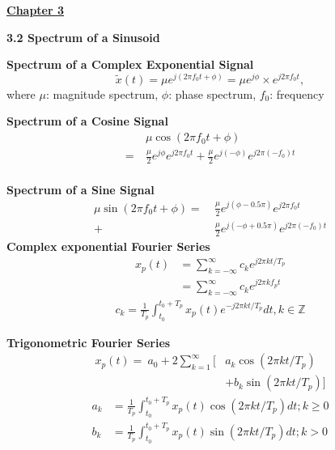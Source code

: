 \documentclass[landscape,a4paper]{extarticle}
\begin{document}
\begin{multicols*}{5}
    \textbf{\uline{Chapter 3}}

    \textbf{3.2 Spectrum of a Sinusoid}

    \textbf{Spectrum of a Complex Exponential Signal}
    \[
        \tilde{x}(t)=\mu e^{j(2\pi f_0t+\phi)} = \mu e^{j\phi} \times e^{j2\pi f_0t},
    \]where $\mu$: magnitude spectrum, $\phi$: phase spectrum, $f_0$: frequency

    \textbf{Spectrum of a Cosine Signal}
    \begin{align*}
        &\mu \cos(2\pi f_0t + \phi)\\
        = \ &\frac{\mu}{2}e^{j\phi}e^{j2\pi f_0t} + \frac{\mu}{2}  e^{j(-\phi)}e^{j2\pi (-f_0)t}
    \end{align*}\\
    \textbf{Spectrum of a Sine Signal}
    \begin{align*}
        \mu\sin(2\pi f_0 t + \phi)
        =\ &\frac{\mu}{2}e^{j(\phi - 0.5\pi)}e^{j2\pi f_0t} \\
        + \ &\frac{\mu}{2}e^{j(-\phi+0.5\pi)}e^{j2\pi (-f_0)t}
    \end{align*}
    \textbf{Complex exponential Fourier Series}
    \begin{align*}
        x_p(t)&=\sum_{k=-\infty}^{\infty}c_ke^{j2\pi kt/T_p}\\
        &=\sum_{k=-\infty}^{\infty}c_ke^{j2\pi kf_pt} \tag{3.1a}
    \end{align*}
    \begin{align*}
        c_k=\frac{1}{T_p}\int_{t_0}^{t_0+T_p}x_p(t)e^{-j2\pi kt/T_p}dt, k \in \mathbb{Z} \tag{3.1b}
    \end{align*}

    \textbf{Trigonometric Fourier Series}
    \begin{align*}
        x_p(t) = \ a_0 + 2\sum_{k=1}^{\infty} [ &a_k \cos(2\pi kt/T_p) \\
        &+ b_k \sin(2\pi kt/T_p)]
    \end{align*}
    \begin{align*}
        a_k&=\frac{1}{T_p}\int_{t_0}^{t_0+T_p}x_p(t)\cos(2\pi kt/T_p)dt; k \geq 0\\
        b_k&=\frac{1}{T_p}\int_{t_0}^{t_0+T_p}x_p(t)\sin(2\pi kt/T_p)dt; k > 0
        \tag{3.2}
    \end{align*}


\end{multicols*}
\end{document}
